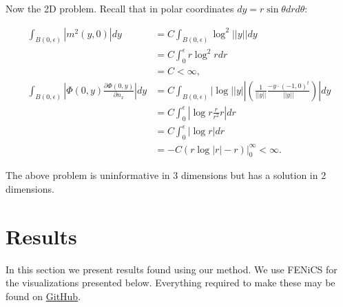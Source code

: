 \documentclass[paper=a4, fontsize=11pt]{scrartcl} %
\numberwithin{equation}{section} %
\numberwithin{figure}{section} %
\numberwithin{table}{section} %
\begin{document}
Now the 2D problem. Recall that in polar coordinates $dy = r\sin \theta dr d\theta$:

\begin{align*}
     \int_{B(0,\epsilon)} |m^2(y,0)|dy &= C \int_{B(0,\epsilon)} \log^2||y|| dy \\
    &= C \int_{0}^{\epsilon} r \log^2 r dr \\
    &= C < \infty, \\
    \int_{B(0,\epsilon)} |\Phi(0,y) \frac{\partial \Phi(0,y)}{\partial n_x}| dy &= C \int_{B(0,\epsilon)} |\log||y|| (\frac{1}{||y||} \frac{-y\cdot (-1,0)^t}{||y||})| dy\\
    &= C\int_{0}^{\epsilon} |\log r\frac{r }{r^2}r| dr\\
    &= C \int_{0}^{\epsilon} |\log r| dr \\
    &= -C(r \log |r| - r)|_{0}^{\infty} < \infty.
\end{align*}

The above problem is uninformative in 3 dimensions but has a solution in 2 dimensions.

\section{Results}
In this section we present results found using our method. We use FENiCS \cite{logg2012automated} for
the visualizations presented below. Everything required to make these may be found on 
\href{https://github.com/yairdaon/covariances}{GitHub}.



\end{document}
